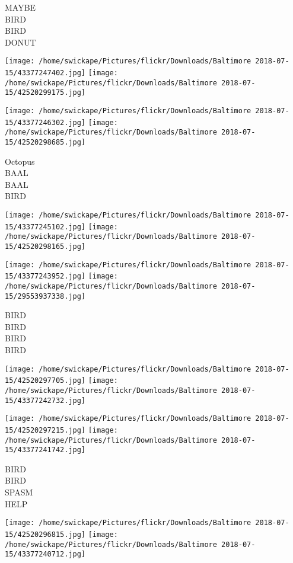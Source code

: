 \documentclass[10pt,letterpaper]{article}
\begin{document}
MAYBE\\
BIRD\\
BIRD\\
DONUT\\
\pagebreak

\texttt{[image: /home/swickape/Pictures/flickr/Downloads/Baltimore 2018-07-15/43377247402.jpg]}
\texttt{[image: /home/swickape/Pictures/flickr/Downloads/Baltimore 2018-07-15/42520299175.jpg]}

\texttt{[image: /home/swickape/Pictures/flickr/Downloads/Baltimore 2018-07-15/43377246302.jpg]}
\texttt{[image: /home/swickape/Pictures/flickr/Downloads/Baltimore 2018-07-15/42520298685.jpg]}

Octopus\\
BAAL\\
BAAL\\
BIRD\\
\pagebreak

\texttt{[image: /home/swickape/Pictures/flickr/Downloads/Baltimore 2018-07-15/43377245102.jpg]}
\texttt{[image: /home/swickape/Pictures/flickr/Downloads/Baltimore 2018-07-15/42520298165.jpg]}

\texttt{[image: /home/swickape/Pictures/flickr/Downloads/Baltimore 2018-07-15/43377243952.jpg]}
\texttt{[image: /home/swickape/Pictures/flickr/Downloads/Baltimore 2018-07-15/29553937338.jpg]}

BIRD\\
BIRD\\
BIRD\\
BIRD\\
\pagebreak

\texttt{[image: /home/swickape/Pictures/flickr/Downloads/Baltimore 2018-07-15/42520297705.jpg]}
\texttt{[image: /home/swickape/Pictures/flickr/Downloads/Baltimore 2018-07-15/43377242732.jpg]}

\texttt{[image: /home/swickape/Pictures/flickr/Downloads/Baltimore 2018-07-15/42520297215.jpg]}
\texttt{[image: /home/swickape/Pictures/flickr/Downloads/Baltimore 2018-07-15/43377241742.jpg]}

BIRD\\
BIRD\\
SPASM\\
HELP\\
\pagebreak

\texttt{[image: /home/swickape/Pictures/flickr/Downloads/Baltimore 2018-07-15/42520296815.jpg]}
\texttt{[image: /home/swickape/Pictures/flickr/Downloads/Baltimore 2018-07-15/43377240712.jpg]}
\end{document}
